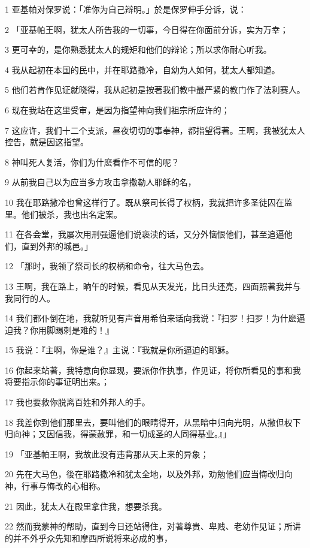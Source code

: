 \par 1 亚基帕对保罗说：「准你为自己辩明。」於是保罗伸手分诉，说：
\par 2 「亚基帕王啊，犹太人所告我的一切事，今日得在你面前分诉，实为万幸；
\par 3 更可幸的，是你熟悉犹太人的规矩和他们的辩论；所以求你耐心听我。
\par 4 我从起初在本国的民中，并在耶路撒冷，自幼为人如何，犹太人都知道。
\par 5 他们若肯作见证就晓得，我从起初是按著我们教中最严紧的教门作了法利赛人。
\par 6 现在我站在这里受审，是因为指望神向我们祖宗所应许的；
\par 7 这应许，我们十二个支派，昼夜切切的事奉神，都指望得著。王啊，我被犹太人控告，就是因这指望。
\par 8 神叫死人复活，你们为什麽看作不可信的呢？
\par 9 从前我自己以为应当多方攻击拿撒勒人耶稣的名，
\par 10 我在耶路撒冷也曾这样行了。既从祭司长得了权柄，我就把许多圣徒囚在监里。他们被杀，我也出名定案。
\par 11 在各会堂，我屡次用刑强逼他们说亵渎的话，又分外恼恨他们，甚至追逼他们，直到外邦的城邑。」
\par 12 「那时，我领了祭司长的权柄和命令，往大马色去。
\par 13 王啊，我在路上，晌午的时候，看见从天发光，比日头还亮，四面照著我并与我同行的人。
\par 14 我们都仆倒在地，我就听见有声音用希伯来话向我说：『扫罗！扫罗！为什麽逼迫我？你用脚踢刺是难的！』
\par 15 我说：『主啊，你是谁？』主说：『我就是你所逼迫的耶稣。
\par 16 你起来站著，我特意向你显现，要派你作执事，作见证，将你所看见的事和我将要指示你的事证明出来。；
\par 17 我也要救你脱离百姓和外邦人的手。
\par 18 我差你到他们那里去，要叫他们的眼睛得开，从黑暗中归向光明，从撒但权下归向神；又因信我，得蒙赦罪，和一切成圣的人同得基业。』」
\par 19 「亚基帕王啊，我故此没有违背那从天上来的异象；
\par 20 先在大马色，後在耶路撒冷和犹太全地，以及外邦，劝勉他们应当悔改归向神，行事与悔改的心相称。
\par 21 因此，犹太人在殿里拿住我，想要杀我。
\par 22 然而我蒙神的帮助，直到今日还站得住，对著尊贵、卑贱、老幼作见证；所讲的并不外乎众先知和摩西所说将来必成的事，
